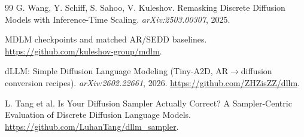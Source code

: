 \documentclass[11pt]{article}
\begin{document}
\begin{thebibliography}{99}
 G. Wang, Y. Schiff, S. Sahoo, V. Kuleshov. Remasking Discrete Diffusion Models with Inference-Time Scaling. \emph{arXiv:2503.00307}, 2025.

 MDLM checkpoints and matched AR/SEDD baselines. \url{https://github.com/kuleshov-group/mdlm}.

 dLLM: Simple Diffusion Language Modeling (Tiny-A2D, AR$\to$diffusion conversion recipes). \emph{arXiv:2602.22661}, 2026. \url{https://github.com/ZHZisZZ/dllm}.

 L. Tang et al. Is Your Diffusion Sampler Actually Correct? A Sampler-Centric Evaluation of Discrete Diffusion Language Models. \url{https://github.com/LuhanTang/dllm_sampler}.

\end{thebibliography}
\end{document}
